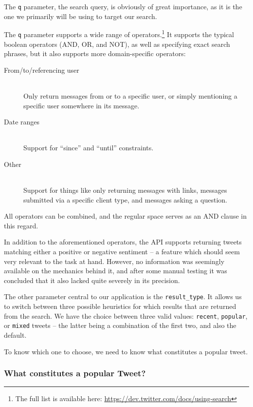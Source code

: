 The \texttt{q} parameter, the search query, is obviously of great importance, as it is the one we primarily will be using to target our search.

The \texttt{q} parameter supports a wide range of operators.\footnote{The full list is available here: \url{https://dev.twitter.com/docs/using-search}} It supports the typical boolean operators (AND, OR, and NOT), as well as specifying exact search phrases, but it also supports more domain-specific operators:

\begin{description}
  \item[From/to/referencing user] \hfill \\
    Only return messages from or to a specific user, or simply mentioning a specific user somewhere in its message.
  \item[Date ranges] \hfill \\
    Support for ``since'' and ``until'' constraints.
  \item[Other] \hfill \\
    Support for things like only returning messages with links, messages submitted via a specific client type, and messages asking a question.
\end{description}

All operators can be combined, and the regular space serves as an AND clause in this regard.

In addition to the aforementioned operators, the API supports returning tweets matching either a positive or negative sentiment -- a feature which should seem very relevant to the task at hand. However, no information was seemingly available on the mechanics behind it, and after some manual testing it was concluded that it also lacked quite severely in its precision.

The other parameter central to our application is the \texttt{result\_type}. It allows us to switch between three possible heuristics for which results that are returned from the search. We have the choice between three valid values: \texttt{recent}, \texttt{popular}, or \texttt{mixed} tweets -- the latter being a combination of the first two, and also the default.

To know which one to choose, we need to know what constitutes a popular tweet.

\subsubsection{What constitutes a popular Tweet?}

